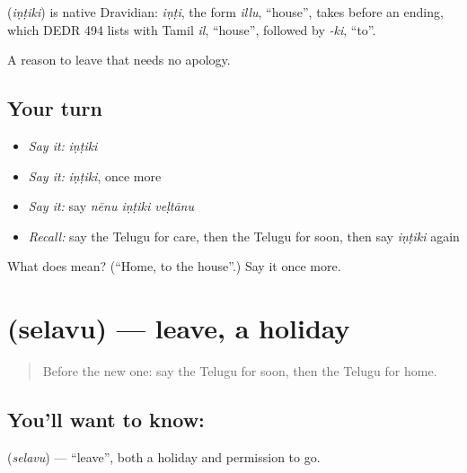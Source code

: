 \begin{cousinweb}
\textbf{} (\emph{iṇṭiki}) is native Dravidian: \emph{iṇṭi}, the form \emph{illu}, \textquotedblleft{}house\textquotedblright{}, takes before an ending, which DEDR 494 lists with Tamil \emph{il}, \textquotedblleft{}house\textquotedblright{}, followed by \emph{-ki}, \textquotedblleft{}to\textquotedblright{}.
\end{cousinweb}

\begin{grammarlens}[title={What you've built}]
A reason to leave that needs no apology.
\end{grammarlens}

\subsection*{Your turn}
\begin{itemize}
\raggedright
  \item \emph{Say it:} \emph{iṇṭiki}
  \item \emph{Say it:} \emph{iṇṭiki}, once more
  \item \emph{Say it:} say \emph{nēnu iṇṭiki veḷtānu}
  \item \emph{Recall:} say the Telugu for care, then the Telugu for soon, then say \emph{iṇṭiki} again
\end{itemize}

\begin{tcolorbox}[breakable,colback=teal!4,colframe=teal!35!black,title={Before you move on}]
What does  mean? (\textquotedblleft{}Home, to the house\textquotedblright{}.) Say it once more.
\end{tcolorbox}
\section[\texorpdfstring{\te{సెలవు} (selavu)}{సెలవు (selavu)}]{ (selavu) — leave, a holiday}

\label{lesson:TE-C90-leave}



\begin{quote}
Before the new one: say the Telugu for soon, then the Telugu for home.
\end{quote}

\subsection*{You'll want to know: }
\textbf{} (\emph{selavu}) — \textquotedblleft{}leave\textquotedblright{}, both a holiday and permission to go.

